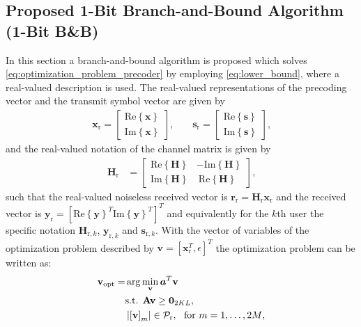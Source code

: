 \documentclass[journal,comsoc]{IEEEtran}
\begin{document}
\subsection{Proposed 1-Bit Branch-and-Bound Algorithm (1-Bit B\&B)}
\label{sec:bb_algorithm_design}
In this section a branch-and-bound algorithm is proposed which solves \eqref{eq:optimization_problem_precoder} by employing \eqref{eq:lower_bound}, where a real-valued description is used.
The real-valued representations of the precoding vector and the transmit symbol vector are given by
\begin{align}								
\mathbf{x}_{\textrm{r}}					=			\begin{bmatrix} \mathrm{Re} \left\{\mathbf{x}\right\} \\  \mathrm{Im} \left\{\mathbf{x}\right\} \end{bmatrix} \textrm{,} \qquad
\mathbf{s}_{\textrm{r}}					=			\begin{bmatrix} \mathrm{Re} \left\{\mathbf{s}\right\} \\  \mathrm{Im} \left\{\mathbf{s}\right\} \end{bmatrix}  \textrm{,} 
\end{align}
and the real-valued notation of the channel matrix is given by
\begin{align}
\mathbf{H}_{\textrm{r}}    &=       \begin{bmatrix}    \mathrm{Re} \left\{  \mathbf{H}  \right\}  &  -\mathrm{Im} \left\{  \mathbf{H}  \right\} \\
								\mathrm{Im} \left\{  \mathbf{H}  \right\} &  \ \mathrm{Re} \left\{  \mathbf{H}  \right\} 
								\end{bmatrix} \textrm{,}
\end{align}
such that the real-valued noiseless received vector is $\mathbf{r}_{\textrm{r}} =\mathbf{H}_{\textrm{r}} \mathbf{x}_{\textrm{r}}$ and the received vector is $\mathbf{y}_{\textrm{r}}=[\mathrm{Re}\left\{\mathbf{y}\right\}^T \mathrm{Im}\left\{\mathbf{y}\right\}^T ]^T$ and equivalently for the $k$th user the specific notation $\mathbf{H}_{\textrm{r},k}$, $\mathbf{y}_{\textrm{r},k}$ and $\mathbf{s}_{\textrm{r},k}$.
With the vector of variables of the optimization problem described by $\mathbf{v}=[\mathbf{x}_{\textrm{r}}^T, \epsilon]^T$ the optimization problem can be written as:
\begin{align}
\label{eq:v_real}
\mathbf{v}_{\text{opt}}=& \arg\min_{\mathbf{v}}  \boldsymbol{a}^T \mathbf{v} \\
& \textrm{s.t. } \mathbf{A} \mathbf{v} \geq  \boldsymbol{0}_{2 K L},  \notag \\
&     \left|\left[\mathbf{v}\right]_{m}\right|   \in \mathcal{P}_{\mathrm{r}},  \ \  \textrm{for } m=1,\ldots,2M     \textrm{,} \notag
\end{align}
\end{document}
